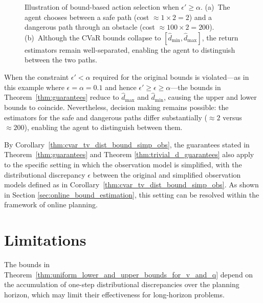 \documentclass[acmlarge, manuscript, screen, review, natbib=false, oneside]{acmart}
\begin{document}
\begin{figure}[t]
{%
		\label{fig:collapsed_bounds_intervals}
	}
	\caption{Illustration of bound-based action selection when $\epsilon' \geq \alpha$. (a)~The agent chooses between a safe path (cost $\approx 1 \times 2 = 2$) and a dangerous path through an obstacle (cost $\approx 100 \times 2 = 200$). (b)~Although the CVaR bounds collapse to $[\hat{d}_{\min}, \hat{d}_{\max}]$, the return estimators remain well-separated, enabling the agent to distinguish between the two paths.}
	\label{fig:collapsed_bounds_example}
\end{figure}

When the constraint $\epsilon' < \alpha$ required for the original bounds is violated---as in this example where $\epsilon = \alpha = 0.1$ and hence $\epsilon' \geq \epsilon \geq \alpha$---the bounds in Theorem~\ref{thm:guarantees} reduce to $\hat{d}_{\max}$ and $\hat{d}_{\min}$, causing the upper and lower bounds to coincide. Nevertheless, decision making remains possible: the estimators for the safe and dangerous paths differ substantially ($\approx 2$ versus $\approx 200$), enabling the agent to distinguish between them.

By Corollary~\ref{thm:cvar_tv_dist_bound_simp_obs}, the guarantees stated in Theorem~\ref{thm:guarantees} and Theorem \ref{thm:trivial_d_guarantees} also apply to the specific setting in which the observation model is simplified, with the distributional discrepancy $\epsilon$ between the original and simplified observation models defined as in Corollary~\ref{thm:cvar_tv_dist_bound_simp_obs}. As shown in Section \ref{sec:online_bound_estimation}, this setting can be resolved within the framework of online planning.
\section{Limitations}\label{sec:limitations}
The bounds in Theorem~\ref{thm:uniform_lower_and_upper_bounds_for_v_and_q} depend on the accumulation of one-step distributional discrepancies over the planning horizon, which may limit their effectiveness for long-horizon problems.
\end{document}
